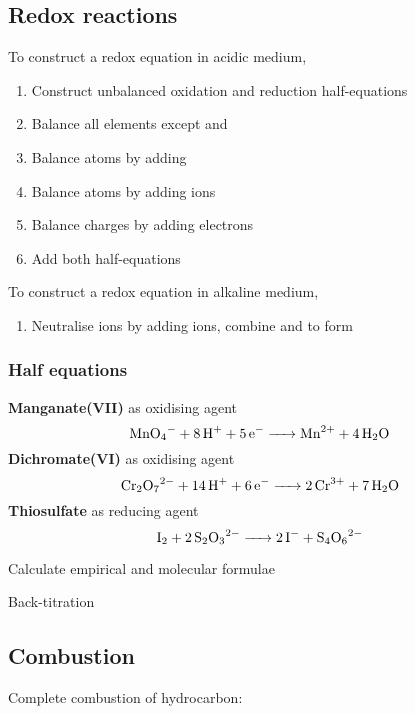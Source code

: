 \subsection{Redox reactions}
To construct a redox equation in acidic medium,
\begin{enumerate}
\item Construct unbalanced oxidation and reduction half-equations
\item Balance all elements except  and 
\item Balance  atoms by adding 
\item Balance  atoms by adding  ions
\item Balance charges by adding electrons
\item Add both half-equations
\end{enumerate}

To construct a redox equation in alkaline medium,
\begin{enumerate}[resume]
\item Neutralise  ions by adding  ions, combine  and  to form 
\end{enumerate}

\subsubsection{Half equations}
\textbf{Manganate(VII)} as oxidising agent
\[ \ce{MnO4^- + 8 H^+ + 5 e^- -> Mn^2+ + 4 H2O} \]
\textbf{Dichromate(VI)} as oxidising agent
\[ \ce{Cr2O7^2- + 14 H^+ + 6 e^- -> 2 Cr^3+ + 7 H2O} \]
\textbf{Thiosulfate} as reducing agent
\[ \ce{I2 + 2 S2O3^2- -> 2 I^- + S4O6^2-} \]

Calculate empirical and molecular formulae

Back-titration

\subsection{Combustion}
Complete combustion of hydrocarbon:
\begin{center}
\end{center}
\pagebreak
